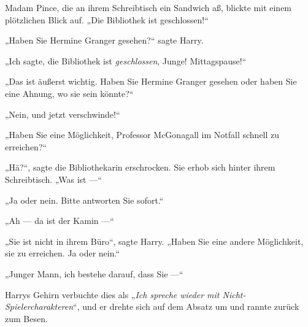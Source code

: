 Madam Pince, die an ihrem Schreibtisch ein Sandwich aß, blickte mit einem plötzlichen Blick auf.
„Die Bibliothek ist geschlossen!“

„Haben Sie Hermine Granger gesehen?“ sagte Harry.

„Ich sagte, die Bibliothek ist \emph{geschlossen}, Junge! Mittagspause!“

„Das ist äußerst wichtig. Haben Sie Hermine Granger gesehen oder haben Sie eine Ahnung, wo sie sein könnte?“

„Nein, und jetzt verschwinde!“

„Haben Sie eine Möglichkeit, Professor McGonagall im Notfall schnell zu erreichen?“

„Hä?“, sagte die Bibliothekarin erschrocken. Sie erhob sich hinter ihrem Schreibtisch.
„Was ist —“

„Ja oder nein. Bitte antworten Sie sofort.“

„Ah — da ist der Kamin —“

„Sie ist nicht in ihrem Büro“, sagte Harry.
„Haben Sie eine andere Möglichkeit, sie zu erreichen. Ja oder nein.“

„Junger Mann, ich bestehe darauf, dass Sie —“

Harrys Gehirn verbuchte dies als
„\emph{Ich spreche wieder mit Nicht-Spielercharakteren}“, und er drehte sich auf dem Absatz um und rannte zurück zum Besen.

